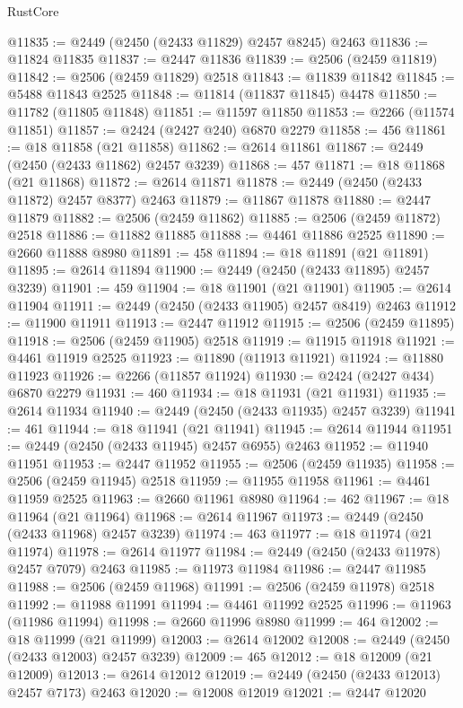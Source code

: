 \begin{lexlean}{RustCore}
\begin{coremodule}
@11835 := @2449 (@2450 (@2433 @11829) @2457 @8245) @2463
@11836 := @11824 @11835
@11837 := @2447 @11836
@11839 := @2506 (@2459 @11819)
@11842 := @2506 (@2459 @11829) @2518
@11843 := @11839 @11842
@11845 := @5488 @11843 @2525
@11848 := @11814 (@11837 @11845) @4478
@11850 := @11782 (@11805 @11848)
@11851 := @11597 @11850
@11853 := @2266 (@11574 @11851)
@11857 := @2424 (@2427 @240) @6870 @2279
@11858 := 456
@11861 := @18 @11858 (@21 @11858)
@11862 := @2614 @11861
@11867 := @2449 (@2450 (@2433 @11862) @2457 @3239)
@11868 := 457
@11871 := @18 @11868 (@21 @11868)
@11872 := @2614 @11871
@11878 := @2449 (@2450 (@2433 @11872) @2457 @8377) @2463
@11879 := @11867 @11878
@11880 := @2447 @11879
@11882 := @2506 (@2459 @11862)
@11885 := @2506 (@2459 @11872) @2518
@11886 := @11882 @11885
@11888 := @4461 @11886 @2525
@11890 := @2660 @11888 @8980
@11891 := 458
@11894 := @18 @11891 (@21 @11891)
@11895 := @2614 @11894
@11900 := @2449 (@2450 (@2433 @11895) @2457 @3239)
@11901 := 459
@11904 := @18 @11901 (@21 @11901)
@11905 := @2614 @11904
@11911 := @2449 (@2450 (@2433 @11905) @2457 @8419) @2463
@11912 := @11900 @11911
@11913 := @2447 @11912
@11915 := @2506 (@2459 @11895)
@11918 := @2506 (@2459 @11905) @2518
@11919 := @11915 @11918
@11921 := @4461 @11919 @2525
@11923 := @11890 (@11913 @11921)
@11924 := @11880 @11923
@11926 := @2266 (@11857 @11924)
@11930 := @2424 (@2427 @434) @6870 @2279
@11931 := 460
@11934 := @18 @11931 (@21 @11931)
@11935 := @2614 @11934
@11940 := @2449 (@2450 (@2433 @11935) @2457 @3239)
@11941 := 461
@11944 := @18 @11941 (@21 @11941)
@11945 := @2614 @11944
@11951 := @2449 (@2450 (@2433 @11945) @2457 @6955) @2463
@11952 := @11940 @11951
@11953 := @2447 @11952
@11955 := @2506 (@2459 @11935)
@11958 := @2506 (@2459 @11945) @2518
@11959 := @11955 @11958
@11961 := @4461 @11959 @2525
@11963 := @2660 @11961 @8980
@11964 := 462
@11967 := @18 @11964 (@21 @11964)
@11968 := @2614 @11967
@11973 := @2449 (@2450 (@2433 @11968) @2457 @3239)
@11974 := 463
@11977 := @18 @11974 (@21 @11974)
@11978 := @2614 @11977
@11984 := @2449 (@2450 (@2433 @11978) @2457 @7079) @2463
@11985 := @11973 @11984
@11986 := @2447 @11985
@11988 := @2506 (@2459 @11968)
@11991 := @2506 (@2459 @11978) @2518
@11992 := @11988 @11991
@11994 := @4461 @11992 @2525
@11996 := @11963 (@11986 @11994)
@11998 := @2660 @11996 @8980
@11999 := 464
@12002 := @18 @11999 (@21 @11999)
@12003 := @2614 @12002
@12008 := @2449 (@2450 (@2433 @12003) @2457 @3239)
@12009 := 465
@12012 := @18 @12009 (@21 @12009)
@12013 := @2614 @12012
@12019 := @2449 (@2450 (@2433 @12013) @2457 @7173) @2463
@12020 := @12008 @12019
@12021 := @2447 @12020

\end{coremodule}
\end{lexlean}
